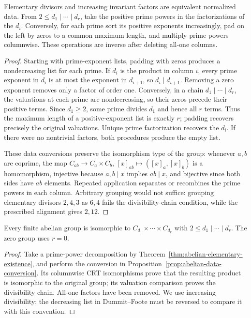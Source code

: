 \begin{proposition}\label{prop:abelian-data-conversion}
Elementary divisors and increasing invariant factors are equivalent normalized data. From $2\leq d_1\mid\cdots\mid d_r$, take the positive prime powers in the factorizations of the $d_i$. Conversely, for each prime sort its positive exponents increasingly, pad on the left by zeros to a common maximum length, and multiply prime powers columnwise. These operations are inverse after deleting all-one columns.
\end{proposition}
\begin{proof}
Starting with prime-exponent lists, padding with zeros produces a nondecreasing list for each prime. If $d_i$ is the product in column $i$, every prime exponent in $d_i$ is at most the exponent in $d_{i+1}$, so $d_i\mid d_{i+1}$. Removing a zero exponent removes only a factor of order one. Conversely, in a chain $d_1\mid\cdots\mid d_r$, the valuations at each prime are nondecreasing, so their zeros precede their positive terms. Since $d_1\geq2$, some prime divides $d_1$ and hence all $r$ terms. Thus the maximum length of a positive-exponent list is exactly $r$; padding recovers precisely the original valuations. Unique prime factorization recovers the $d_i$. If there were no nontrivial factors, both procedures produce the empty list.

These data conversions preserve the isomorphism type of the group: whenever $a,b$ are coprime, the map $C_{ab}\to C_a\times C_b$, $[x]_{ab}\mapsto([x]_a,[x]_b)$ is a homomorphism, injective because $a,b\mid x$ implies $ab\mid x$, and bijective since both sides have $ab$ elements. Repeated application separates or recombines the prime powers in each column. Arbitrary grouping would not suffice: grouping elementary divisors $2,4,3$ as $6,4$ fails the divisibility-chain condition, while the prescribed alignment gives $2,12$.
\end{proof}

\begin{theorem}\label{thm:abelian-invariant-existence}
Every finite abelian group is isomorphic to $C_{d_1}\times\cdots\times C_{d_r}$ with $2\leq d_1\mid\cdots\mid d_r$. The zero group uses $r=0$.
\end{theorem}
\begin{proof}
Take a prime-power decomposition by Theorem~\ref{thm:abelian-elementary-existence}, and perform the conversion in Proposition~\ref{prop:abelian-data-conversion}. Its columnwise CRT isomorphisms prove that the resulting product is isomorphic to the original group; its valuation comparison proves the divisibility chain. All-one factors have been removed. We use increasing divisibility; the decreasing list in Dummit--Foote must be reversed to compare it with this convention.
\end{proof}

